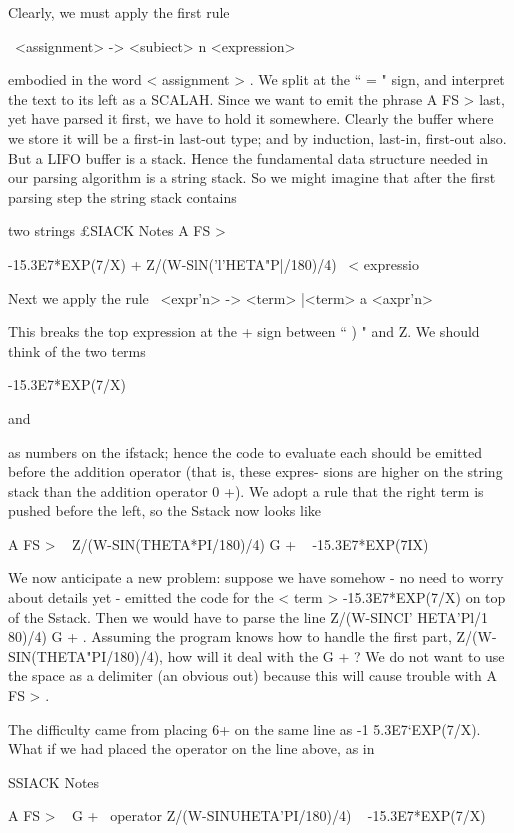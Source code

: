 Clearly, we must apply the first rule

\ <assignment> -> <subiect> n <expression>

embodied in the word < assignment > . We split at the “ = " sign,
and interpret the text to its left as a SCALAH. Since we want to
emit the phrase A FS > last, yet have parsed it first, we have to
hold it somewhere. Clearly the buffer where we store it will be a
first-in last-out type; and by induction, last-in, first-out also. But
a LIFO buffer is a stack. Hence the fundamental data structure
needed in our parsing algorithm is a string stack. So we might
imagine that after the first parsing step the string stack contains

 

two strings
£SIACK Notes
A FS > \ < subject >

-15.3E7*EXP(7/X) + Z/(W-SlN('l’HETA"P|/180)/4) \ < expressio

Next we apply the rule
\ <expr'n> -> <term> |<term> a <axpr'n>

This breaks the top expression at the + sign between “ ) " and Z.
We should think of the two terms

-15.3E7*EXP(7/X)

and

as numbers on the ifstack; hence the code to evaluate each should
be emitted before the addition operator (that is, these expres-
sions are higher on the string stack than the addition operator
0 +). We adopt a rule that the right term is pushed before the
left, so the Sstack now looks like


A FS > \ < subject >
Z/(W-SIN(THETA*PI/180)/4) G + \ <term >
-15.3E7*EXP(7IX) \ < term >

We now anticipate a new problem: suppose we have somehow -
no need to worry about details yet - emitted the code for the
< term > -15.3E7*EXP(7/X) on top of the Sstack. Then we
would have to parse the line Z/(W-SINCI’ HETA'Pl/1 80)/4) G + .
Assuming the program knows how to handle the first part,
Z/(W-SIN(THETA"PI/180)/4), how will it deal with the G + ?
We do not want to use the space as a delimiter (an obvious out)
because this will cause trouble with A FS > .

The difficulty came from placing 6+ on the same line as
-1 5.3E7‘EXP(7/X). What if we had placed the operator on the
line above, as in

 

SSIACK Notes

A FS > \ < subject >
G + \ operator
Z/(W-SINUHETA'PI/180)/4) \ < term >
-15.3E7*EXP(7/X) \ < term >

